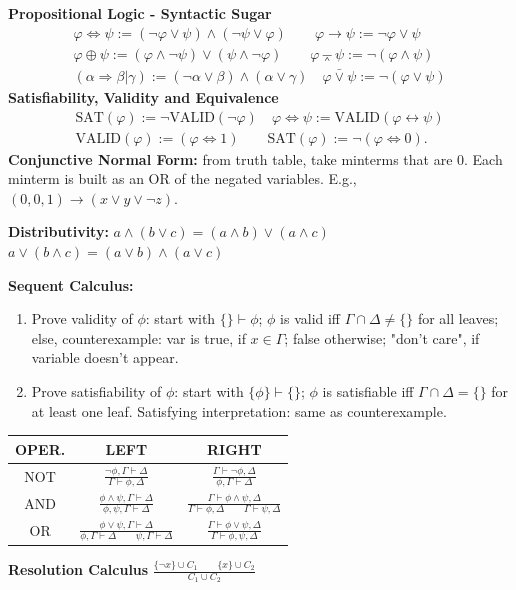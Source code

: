 \documentclass{article}
\begin{document}
\begin{multicols}{4}
\textbf{Propositional Logic - Syntactic Sugar} 
\begin{gather*} 
{\varphi \Leftrightarrow \psi := (\neg \varphi \vee \psi) \wedge (\neg \psi \vee \varphi)} \qquad {\varphi \rightarrow \psi := \neg \varphi \vee \psi} \\
{\varphi \oplus \psi := (\varphi \wedge \neg \psi) \vee (\psi \wedge \neg \varphi) }\qquad {\varphi \barwedge \psi := \neg (\varphi \wedge \psi)} \\
{(\alpha \Rightarrow \beta | \gamma) := ( \neg \alpha \vee \beta) \wedge (\alpha \vee \gamma)} \quad {\varphi \bar{\vee}\psi := \neg (\varphi \vee \psi)}
\end{gather*}
\textbf{Satisfiability, Validity and Equivalence}
\begin{gather*}
\text{SAT}(\varphi) := \neg \text{VALID}(\neg \varphi) \quad \varphi \Leftrightarrow \psi := \text{VALID}(\varphi \leftrightarrow \psi) \\
\text{VALID}(\varphi) := (\varphi \Leftrightarrow 1) \qquad \text{SAT}(\varphi) := \neg(\varphi \Leftrightarrow 0).
\end{gather*}
\textbf{Conjunctive Normal Form:} from truth table, take minterms that are 0. 
Each minterm is built as an OR of the negated variables. E.g., ${(0, 0, 1) \rightarrow (x \vee y \vee \neg z)}$.

\textbf{Distributivity:} ${a \wedge ( b \vee c ) = (a \wedge b) \vee (a \wedge c)}$
${a \vee ( b \wedge c ) = (a \vee b) \wedge (a \vee c)}$

\textbf{Sequent Calculus:}
\begin{enumerate}
\item Prove validity of $\phi$: start with $\{\} \vdash {\phi}$;  $\phi$ is valid iff $\Gamma \cap \Delta \neq \{\}$ for all leaves; else, counterexample: var is true, if $x \in \Gamma$; false otherwise; "don't care", if variable doesn't appear.
\item Prove satisfiability of $\phi$: start with $\{\phi\} \vdash \{\}$; $\phi$ is satisfiable iff $\Gamma \cap \Delta = \{\}$ for at least one leaf. Satisfying interpretation: same as counterexample.
\end{enumerate}
\begin{tabular}{|c|c|c|}
\hline
OPER. & LEFT & RIGHT \\ \hline
NOT & $\frac{\neg \phi,\Gamma \vdash \Delta}{\Gamma \vdash \phi, \Delta}$ & $\frac{\Gamma \vdash \neg \phi, \Delta}{\phi, \Gamma \vdash \Delta}$ \\ \hline
AND & $\frac{\phi \wedge \psi,\Gamma \vdash \Delta}{\phi, \psi,\Gamma \vdash \Delta}$ & $\frac{\Gamma \vdash \phi \wedge \psi, \Delta}{\Gamma \vdash \phi,\Delta \qquad \Gamma \vdash \psi,\Delta}$\\ \hline
OR & $\frac{\phi \vee \psi,\Gamma \vdash \Delta}{\phi,\Gamma \vdash \Delta \qquad \psi,\Gamma \vdash \Delta}$ & $\frac{\Gamma \vdash \phi \vee \psi, \Delta}{\Gamma \vdash \phi, \psi, \Delta}$ \\ \hline
\end{tabular}
\textbf{Resolution Calculus} $\frac{\{\neg x \} \cup C_1 \qquad \{x \} \cup C_2 }{C_1 \cup C_2}$


\end{multicols}
\end{document}
